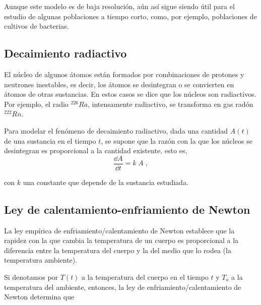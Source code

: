 \begin{small}
Aunque este modelo es de baja resolución, aún así sigue siendo útil para el estudio de algunas poblaciones a tiempo corto, como, por ejemplo, poblaciones de cultivos de bacterias. 


\subsection{Decaimiento radiactivo}    

El núcleo de algunos átomos están formados por combinaciones de protones y neutrones inestables, es decir, los átomos se desintegran o se convierten en átomos de otras sustancias. En estos casos se dice que los núcleos son radiactivos. Por ejemplo, el radio $^{ 226 }{ Ra }$, intensamente radiactivo, se transforma en gas radón $^{ 222 }{ Rn }$.
 
Para modelar el fenómeno de decaimiento radiactivo, dada una cantidad $A(t)$ de una sustancia en el tiempo $t$, se supone que la razón con la que los núcleos se desintegran es proporcional a la cantidad existente, esto es, 
\begin{equation*}
	\dfrac {\dd A}{\dd t}= k\; A\; ,
\end{equation*}

con $k$ una constante que depende de la sustancia estudiada. 

\subsection{Ley de calentamiento-enfriamiento de Newton}
	  
La ley empírica de enfriamiento/calentamiento de Newton establece que la rapidez con la que cambia la temperatura de un cuerpo es proporcional a la diferencia entre la temperatura del cuerpo y la del medio que lo rodea (la temperatura ambiente). 
 
Si denotamos por $T(t)$ a la temperatura del cuerpo en el tiempo $t$ y $T_a$ a la temperatura del ambiente, entonces, la ley de enfriamiento/calentamiento de Newton determina que 
  

\end{small}
